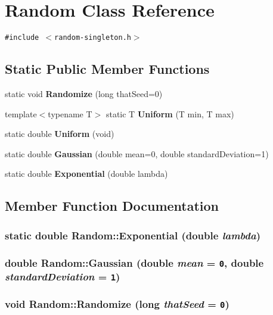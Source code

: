 \section{Random Class Reference}
\label{classRandom}
{\tt \#include $<$random-singleton.h$>$}

\subsection*{Static Public Member Functions}
\begin{CompactItemize}
\item 
static void {\bf Randomize} (long that\-Seed=0)
\item 
template$<$typename T$>$ static T {\bf Uniform} (T min, T max)
\item 
static double {\bf Uniform} (void)
\item 
static double {\bf Gaussian} (double mean=0, double standard\-Deviation=1)
\item 
static double {\bf Exponential} (double lambda)
\end{CompactItemize}


\subsection{Member Function Documentation}
\subsubsection{\setlength{\rightskip}{0pt plus 5cm}static double Random::Exponential (double {\em lambda})\hspace{0.3cm}{\tt  [inline, static]}}\label{classRandom_e4}


\subsubsection{\setlength{\rightskip}{0pt plus 5cm}double Random::Gaussian (double {\em mean} = {\tt 0}, double {\em standard\-Deviation} = {\tt 1})\hspace{0.3cm}{\tt  [static]}}\label{classRandom_e3}


\subsubsection{\setlength{\rightskip}{0pt plus 5cm}void Random::Randomize (long {\em that\-Seed} = {\tt 0})\hspace{0.3cm}{\tt  [static]}}\label{classRandom_e0}


